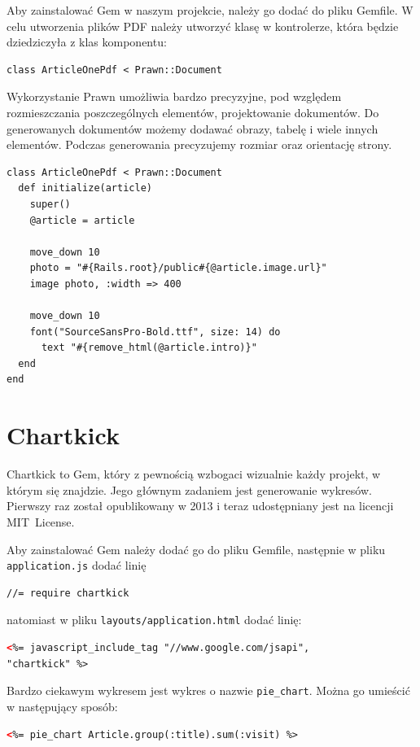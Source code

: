 \documentclass[openright]{xmgr}
\begin{document}
Aby zainstalować Gem w naszym projekcie, należy go dodać do pliku Gemfile. W celu utworzenia plików PDF należy utworzyć klasę w kontrolerze, która będzie dziedziczyła z klas komponentu:
\begin{lstlisting}[language=ruby2, caption={Deklaracja klasy generującej plik PDF}]
class ArticleOnePdf < Prawn::Document
\end{lstlisting}
Wykorzystanie Prawn umożliwia bardzo precyzyjne, pod względem rozmieszczania poszczególnych elementów, projektowanie dokumentów. Do generowanych dokumentów możemy dodawać obrazy, tabelę  i wiele innych elementów. Podczas generowania precyzujemy rozmiar oraz orientację strony.
\begin{lstlisting}[language=ruby2, caption={Kod generujący dokument zawierający ilustrację i wstęp do artykułu}]
class ArticleOnePdf < Prawn::Document
  def initialize(article)
    super()
    @article = article

    move_down 10
    photo = "#{Rails.root}/public#{@article.image.url}"
    image photo, :width => 400

    move_down 10
    font("SourceSansPro-Bold.ttf", size: 14) do
      text "#{remove_html(@article.intro)}"
  end
end
\end{lstlisting}

\newpage

\section{Chartkick}
Chartkick \cite{chartkick} to Gem, który z pewnością wzbogaci wizualnie każdy projekt, w którym się znajdzie. Jego głównym zadaniem jest generowanie wykresów. Pierwszy raz został opublikowany w 2013 i teraz udostępniany jest na licencji \mbox{MIT License. }

Aby zainstalować Gem należy dodać go do pliku Gemfile, następnie w pliku \texttt{application.js} dodać linię
\begin{lstlisting}[language=ruby2, caption={Fragment zawartości pliku application.js}]
//= require chartkick
\end{lstlisting}
natomiast w pliku \texttt{layouts/application.html} dodać linię:
\begin{lstlisting}[language=html, caption={Fragment zawartości pliku application.html.rb}]
<%= javascript_include_tag "//www.google.com/jsapi",
"chartkick" %>
\end{lstlisting}

Bardzo ciekawym wykresem jest wykres o nazwie \texttt{pie\_chart}. Można go umieścić w następujący sposób:
\begin{lstlisting}[language=html, caption={Kod generujący wykres kołowy}]
<%= pie_chart Article.group(:title).sum(:visit) %>
\end{lstlisting}
\end{document}
